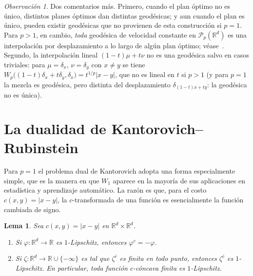 \documentclass[12pt, a4paper]{amsbook}
\newcommand{\R}{{\mathbb R}}
\newtheorem{lema}[teo]{Lema}
\theoremstyle{remark}
\newtheorem{obs}[teo]{Observación}
\theoremstyle{definition}
\numberwithin{section}{chapter}
\numberwithin{subsection}{section}
\numberwithin{equation}{section}
\numberwithin{figure}{chapter}
\begin{document}
\begin{obs}
Dos comentarios más. Primero, cuando el plan óptimo no es único, distintos
planes óptimos dan distintas geodésicas; y aun cuando el plan es único,
pueden existir geodésicas que no provienen de esta construcción si $p=1$.
Para $p>1$, en cambio, \emph{toda} geodésica de velocidad constante en
$\mathcal P_p(\R^d)$ es una interpolación por desplazamiento a lo largo de
algún plan óptimo; véase~\cite[Theorem~7.2.2]{AGS2008}. Segundo, la
interpolación lineal $(1-t)\mu+t\nu$ no es una geodésica salvo en casos
triviales: para $\mu=\delta_{x}$, $\nu=\delta_{y}$ con $x\neq y$ se tiene
$W_p\bigl((1-t)\delta_x+t\delta_y,\delta_x\bigr)=t^{1/p}|x-y|$, que no es
lineal en $t$ si $p>1$ (y para $p=1$ la mezcla es geodésica, pero distinta
del desplazamiento $\delta_{(1-t)x+ty}$: la geodésica no es única).
\end{obs}

\section{La dualidad de Kantorovich--Rubinstein}\label{sec.KR}

Para $p=1$ el problema dual de Kantorovich adopta una forma especialmente
simple, que es la manera en que $W_1$ aparece en la mayoría de sus
aplicaciones en estadística y aprendizaje automático. La razón es que, para
el costo $c(x,y)=|x-y|$, la $c$-transformada de una función es
esencialmente la función cambiada de signo.

\begin{lema}\label{lema.KR.ctransformada}
Sea $c(x,y)=|x-y|$ en $\R^d\times\R^d$.
\begin{enumerate}
\item Si $\varphi\colon\R^d\to\R$ es $1$-Lipschitz, entonces $\varphi^c=-\varphi$.
\item Si $\zeta\colon\R^d\to\R\cup\{-\infty\}$ es tal que
$\zeta^{\bar c}$ es finita en todo punto, entonces $\zeta^{\bar c}$ es
$1$-Lipschitz. En particular, toda función $c$-cóncava finita es $1$-Lipschitz.
\end{enumerate}
\end{lema}
\end{document}
